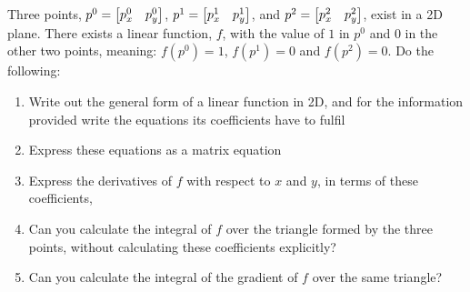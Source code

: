 \documentclass[12pt,class=article,crop=false,preview=false]{standalone}
\begin{document}
\begin{exercise}
    Three points, $p^0=\left[\begin{matrix}p^0_x& p^0_y\end{matrix}\right]$, $p^1=\left[\begin{matrix}p^1_x& p^1_y\end{matrix}\right]$, and $p^2=\left[\begin{matrix}p^2_x& p^2_y\end{matrix}\right]$, exist in a 2D plane. There exists a linear function, $f$, with the value of $1$ in $p^0$ and $0$ in the other two points, meaning: $f(p^0)=1$, $f(p^1)=0$ and $f(p^2)=0$. Do the following:
    \begin{enumerate}[label=\alph*)]
        \item Write out the general form of a linear function in 2D, and for the information provided write the equations its coefficients have to fulfil
        \item Express these equations as a matrix equation
        \item Express the derivatives of $f$ with respect to $x$ and $y$, in terms of these coefficients,
        \item Can you calculate the integral of $f$ over the triangle formed by the three points, without calculating these coefficients explicitly?
        \item Can you calculate the integral of the gradient of $f$ over the same triangle?
    \end{enumerate}
\end{exercise}
\end{document}
